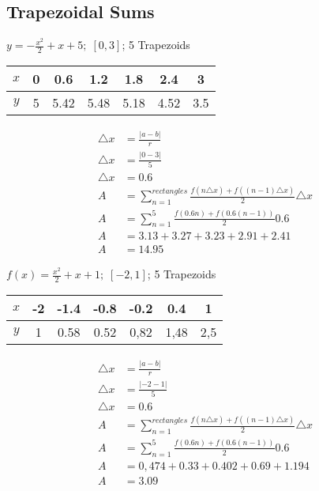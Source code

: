 \documentclass[12pt]{article}
\begin{document}
\subsection*{Trapezoidal Sums}
\begin{multicols}{2}

$y = -\frac{x^2}{2} + x + 5; \; [0, 3]$; 5 Trapezoids

\begin{center}
    \begin{tabular}{ c|c|c|c|c|c|c }
        $x$ & 0 & 0.6 & 1.2 & 1.8 & 2.4 & 3 \\
        \hline
        $y$ & 5 & 5.42 & 5.48 & 5.18 & 4.52 & 3.5\\
    \end{tabular}
    \begin{align*}
        \triangle x &= \frac{|a-b|}{r} \\
        \triangle x &= \frac{|0-3|}{5} \\
        \triangle x &= 0.6 \\
        A &= \sum_{n=1}^{rectangles} \frac{f(n\triangle x)+f((n-1)\triangle x)}{2}\triangle x \\ 
        A &= \sum_{n=1}^{5} \frac{f(0.6n)+f(0.6(n-1))}{2} 0.6 \\ 
        A &= 3.13 + 3.27 + 3.23 + 2.91 + 2.41 \\
        A &= 14.95
    \end{align*}
\end{center}

\columnbreak 
$f(x)=\frac{x^2}{2} + x + 1; \; [-2,1]$; 5 Trapezoids

\begin{center}
    \begin{tabular}{ c|c|c|c|c|c|c }
        $x$ & -2 & -1.4 & -0.8 & -0.2 & 0.4 & 1 \\
        \hline
        $y$ & 1 & 0.58 & 0.52 & 0,82 & 1,48 & 2,5 \\
    \end{tabular}
    \begin{align*}
        \triangle x &= \frac{|a-b|}{r} \\
        \triangle x &= \frac{|-2-1|}{5} \\
        \triangle x &= 0.6 \\
        A &= \sum_{n=1}^{rectangles} \frac{f(n\triangle x)+f((n-1)\triangle x)}{2}\triangle x \\ 
        A &= \sum_{n=1}^{5} \frac{f(0.6n)+f(0.6(n-1))}{2} 0.6 \\ 
        A &= 0,474 + 0.33 + 0.402 + 0.69 + 1.194 \\
        A &= 3.09
    \end{align*}
\end{center}

\end{multicols}
\newpage
\end{document}
